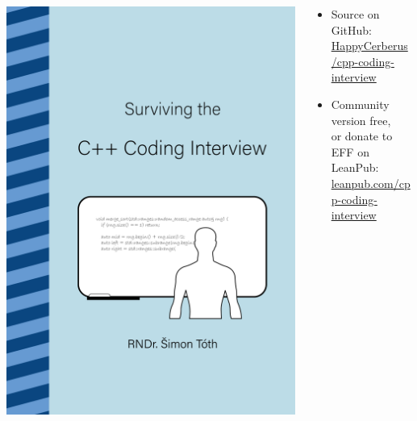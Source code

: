 \documentclass[aspectratio=169]{beamer}
\begin{document}
\begin{frame}{}
  \begin{columns}
      \begin{column}{0.35\textwidth}
          \includegraphics[height=0.8\textheight]{static/book_cover_interview.png}
      \end{column}
      \begin{column}{0.6\textwidth}
          \begin{itemize}
              \item Source on GitHub:\\
                  \href{https://github.com/HappyCerberus/cpp-coding-interview}{HappyCerberus/cpp-coding-interview}
              \item Community version free,\\or donate to EFF on LeanPub:\\
                  \href{https://leanpub.com/cpp-coding-interview}{leanpub.com/cpp-coding-interview}
          \end{itemize}
      \end{column}
  \end{columns}
\end{frame}
\end{document}
